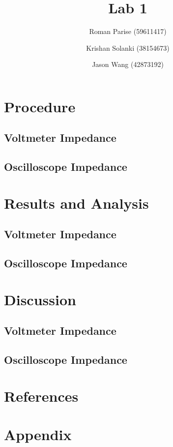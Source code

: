 \documentclass[a4paper,titlepage,10pt]{article}
\title{Lab 1}
\author{
Roman Parise (59611417) \and
Krishan Solanki (38154673) \and
Jason Wang (42873192)}
\begin{document}
\maketitle

\section{Procedure}
\subsection{Voltmeter Impedance}
\subsection{Oscilloscope Impedance}

\section{Results and Analysis}
\subsection{Voltmeter Impedance}
\subsection{Oscilloscope Impedance}


\section{Discussion}
\subsection{Voltmeter Impedance}
\subsection{Oscilloscope Impedance}


\section{References}

\section{Appendix}

\end{document}
